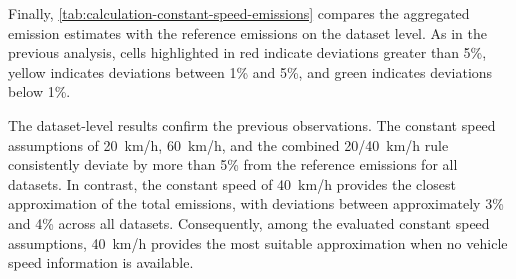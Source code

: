 Finally, \autoref{tab:calculation-constant-speed-emissions} compares the aggregated emission estimates with the reference emissions on the dataset level. As in the previous analysis, cells highlighted in red indicate deviations greater than 5\%, yellow indicates deviations between 1\% and 5\%, and green indicates deviations below 1\%.

The dataset-level results confirm the previous observations. The constant speed assumptions of 20~km/h, 60~km/h, and the combined 20/40~km/h rule consistently deviate by more than 5\% from the reference emissions for all datasets. In contrast, the constant speed of 40~km/h provides the closest approximation of the total emissions, with deviations between approximately 3\% and 4\% across all datasets. Consequently, among the evaluated constant speed assumptions, 40~km/h provides the most suitable approximation when no vehicle speed information is available.



\begin{table}[H]
\caption{Comparison of the reference and constant-speed-based CO$_2$ emission estimates across the KODA datasets at the overall dataset level.}
\label{tab:calculation-constant-speed-emissions}
\end{table}




